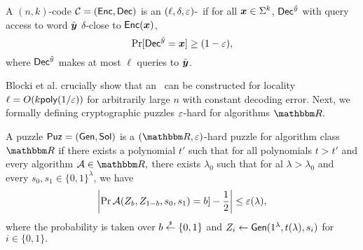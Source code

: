 \begin{definition}\label{def:ldcStar}
    A $(n,k)$-code $\mathcal{C} = (\mathsf{Enc},\mathsf{Dec})$ is an $(\ell,\delta,\varepsilon)$-\LDCStar\ if for all ${\boldsymbol{x}} \in \Sigma^k$, $\mathsf{Dec}^{\tilde{y}}$ with query access to word $\tilde{\boldsymbol{y}}$ $\delta$-close to $\mathsf{Enc}({\boldsymbol{x}})$, 
    \[\Pr[\mathsf{Dec}^{\tilde{y}} = {\boldsymbol{x}}] \geq (1 - \varepsilon),\]
    where $\mathsf{Dec}^{\tilde{y}}$ makes at most $\ell$ queries to $\tilde{\boldsymbol{y}}$.
\end{definition}
Blocki et al. crucially show that an \LDCStar\ can be constructed for locality $\ell = O(k\mathsf{poly}(1/\varepsilon))$ for arbitrarily large $n$ with constant decoding error.
Next, we formally defining cryptographic puzzles $\varepsilon$-hard for algorithms $\R.$
\begin{definition}\label{def:puz}
    A puzzle $\mathsf{Puz} = (\mathsf{Gen},\mathsf{Sol})$ is a $(\R,\eps)$-hard puzzle for algorithm class $\R$ if there exists a polynomial $t'$ such that for all polynomials $t > t'$ and every algorithm $\calA \in \R,$ there exists $\lambda_0$ such that for al $\lambda > \lambda_0$ and every $s_0,s_1 \in \{0,1\}^\lambda$, we have 
    \[\left| \Pr \mathcal{A}(Z_{b},Z_{1 - b},s_0,s_1) = b] - \frac{1}{2}\right| \leq \varepsilon(\lambda),\]
    where the probability is taken over $b \overset{{\scriptscriptstyle\$}}{\leftarrow} \{0,1\}$ and $Z_i \leftarrow \mathsf{Gen}(1^\lambda,t(\lambda),s_i)$ for $i \in \{0,1\}.$
\end{definition}